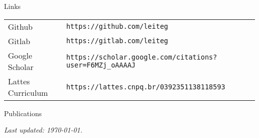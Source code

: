 \documentclass{resume}
\begin{document}
\begin{rSection}{Links}
  \begin{tabular}{ll}
    Github            & {\tt https://github.com/leiteg} \\
    Gitlab            & {\tt https://gitlab.com/leiteg} \\
    Google Scholar    & {\tt https://scholar.google.com/citations?user=F6MZj\_oAAAAJ} \\
    Lattes Curriculum & {\tt https://lattes.cnpq.br/0392351138118593} \\
  \end{tabular}
\end{rSection}

\begin{rSection}{Publications}

\renewcommand{\section}[2]{}

\end{rSection}

\vfill \hfill {\em Last updated: \today.}
\end{document}
